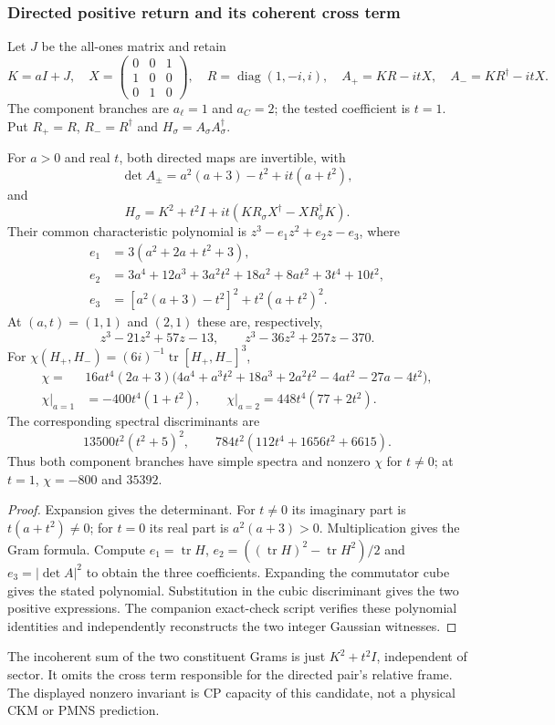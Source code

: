 \documentclass[11pt,a4paper]{article}
\begin{document}
\subsubsection{Directed positive return and its coherent cross term}
Let $J$ be the all-ones matrix and retain
\[
 K=aI+J,\quad X=\begin{pmatrix}0&0&1\\1&0&0\\0&1&0\end{pmatrix},
 \quad R=\operatorname{diag}(1,-i,i),\quad
 A_+=KR-itX,\quad A_-=KR^\dagger-itX.
\]
The component branches are $a_\ell=1$ and $a_C=2$; the tested coefficient
is $t=1$. Put $R_+=R$, $R_-=R^\dagger$ and $H_\sigma=A_\sigma A_\sigma^\dagger$.
\begin{proposition}
\label{p6:prop:v585-directed-invariants}
For $a>0$ and real $t$, both directed maps are invertible, with
\[
 \det A_\pm=a^2(a+3)-t^2+it(a+t^2),
\]
and
\[
 H_\sigma=K^2+t^2I+it(KR_\sigma X^\dagger-XR_\sigma^\dagger K).
\]
Their common characteristic polynomial is $z^3-e_1z^2+e_2z-e_3$, where
\begin{align*}
 e_1&=3(a^2+2a+t^2+3),\\
 e_2&=3a^4+12a^3+3a^2t^2+18a^2+8at^2+3t^4+10t^2,\\
 e_3&=[a^2(a+3)-t^2]^2+t^2(a+t^2)^2.
\end{align*}
At $(a,t)=(1,1)$ and $(2,1)$ these are, respectively,
\[
 z^3-21z^2+57z-13,\qquad z^3-36z^2+257z-370.
\]
For $\chi(H_+,H_-)=(6i)^{-1}\operatorname{tr}[H_+,H_-]^3$,
\begin{align*}
 \chi={}&16at^4(2a+3)\bigl(4a^4+a^3t^2+18a^3
                    +2a^2t^2-4at^2-27a-4t^2\bigr),\\
 \chi|_{a=1}&=-400t^4(1+t^2),\qquad
 \chi|_{a=2}=448t^4(77+2t^2).
\end{align*}
The corresponding spectral discriminants are
\[
 13500t^2(t^2+5)^2,\qquad
 784t^2(112t^4+1656t^2+6615).
\]
Thus both component branches have simple spectra and nonzero $\chi$ for
$t\ne0$; at $t=1$, $\chi=-800$ and $35392$.
\end{proposition}
\begin{proof}
Expansion gives the determinant. For $t\ne0$ its imaginary part is
$t(a+t^2)\ne0$; for $t=0$ its real part is $a^2(a+3)>0$.
Multiplication gives the Gram formula. Compute $e_1=\operatorname{tr}H$,
$e_2=((\operatorname{tr}H)^2-\operatorname{tr}H^2)/2$ and
$e_3=|\det A|^2$ to obtain the three coefficients.
Expanding the commutator cube gives the stated polynomial. Substitution
in the cubic discriminant gives the two positive expressions. The
companion exact-check script verifies these polynomial identities and
independently reconstructs the two integer Gaussian witnesses.
\end{proof}
The incoherent sum of the two constituent Grams is just $K^2+t^2I$,
independent of sector. It omits the cross term responsible for the
directed pair's relative frame. The displayed nonzero invariant is CP
capacity of this candidate, not a physical CKM or PMNS prediction.
\end{document}
